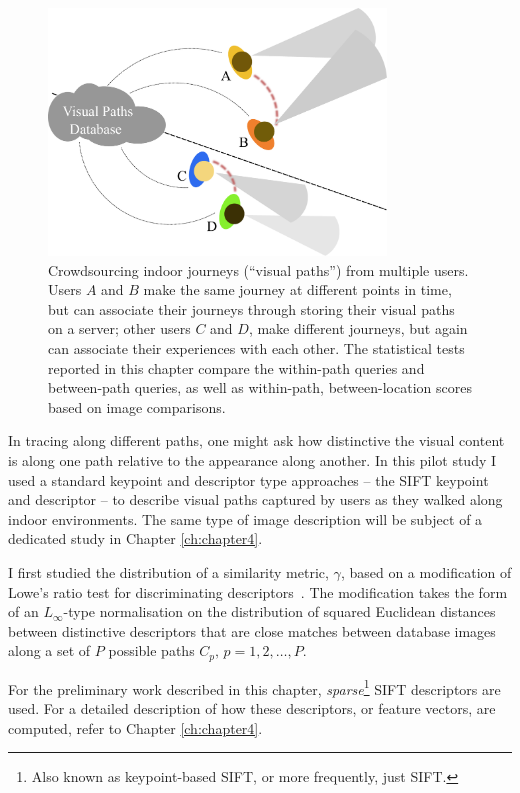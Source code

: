 \begin{figure}[h]
\centering
\includegraphics[width=0.8\textwidth]{./gfx/Chapter02/AssociatingViews.pdf}
\caption{Crowdsourcing indoor journeys (``visual paths'') from multiple users.  Users $A$ and $B$ make the same journey at different points in time, but can associate their journeys through storing their visual paths on a server; other users $C$ and $D$, make different journeys, but again can associate their experiences with each other. The statistical tests reported in this chapter compare the within-path queries and between-path queries, as well as within-path, between-location scores based on image comparisons.}
\label{fig:associatingViews}
\end{figure}

In tracing along different paths, one might ask how distinctive the visual content is along one path relative to the appearance along another. In this pilot study I used a standard keypoint and descriptor type approaches -- the SIFT keypoint and descriptor -- to describe visual paths captured by users as they walked along indoor environments. The same type of image description will be subject of a dedicated study in Chapter \ref{ch:chapter4}.

I first studied the distribution of a similarity metric, $\gamma$, based on a modification of Lowe's ratio test for discriminating descriptors~\cite{Lowe2004}. The modification takes the form of an $L_{\infty}$-type normalisation on the distribution of squared Euclidean distances between distinctive descriptors that are close matches between database images along a set of $P$ possible paths $C_p,\,p=1,2,\ldots, P$.

For the preliminary work described in this chapter, \textit{sparse}\footnote{Also known as keypoint-based SIFT, or more frequently, just SIFT.} SIFT descriptors are used. For a detailed description of how these descriptors, or feature vectors, are computed, refer to Chapter \ref{ch:chapter4}.


